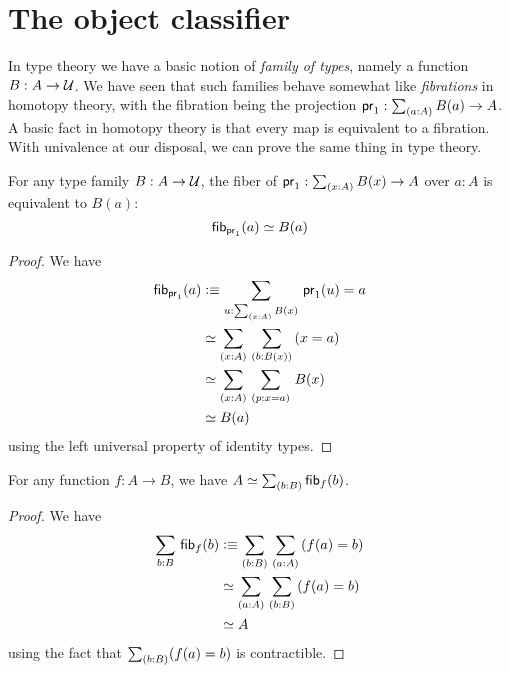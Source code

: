 %


\section{The object classifier}
\label{sec:object-classification}

In type theory we have a basic notion of \emph{family of types}, namely a function $B:A\to\mathcal{U}$.
We have seen that such families behave somewhat like \emph{fibrations} in homotopy theory, with the fibration being the projection $\proj1:\sm{a:A} B(a) \to A$.
A basic fact in homotopy theory is that every map is equivalent to a fibration.
With univalence at our disposal, we can prove the same thing in type theory.

\begin{lem}\label{thm:fiber-of-a-fibration}
  For any type family $B:A\to\mathcal{U}$, the fiber of $\proj1:\sm{x:A} B(x) \to A$ over $a:A$ is equivalent to $B(a)$:
  \[ {\mathsf{fib}}_{\mathsf{pr}_{1}}(a) \simeq B(a) \]
\end{lem}
\begin{proof}
  We have
  \begin{align*}
    \hfib{\proj1}{a} &\defeq \sm{u:\sm{x:A} B(x)} \proj1(u)=a\\
    &\eqvsym \sm{x:A}{b:B(x)} (x=a)\\
    &\eqvsym \sm{x:A}{p:x=a} B(x)\\
    &\eqvsym B(a)
  \end{align*}
  using the left universal property of identity types.
\end{proof}

\begin{lem}\label{thm:total-space-of-the-fibers}
  For any function $f:A\to B$, we have $\eqv{A}{\sm{b:B}\hfib{f}{b}}$.
\end{lem}
\begin{proof}
  We have
  \begin{align*}
    \sm{b:B}\hfib{f}{b} &\defeq \sm{b:B}{a:A} (f(a)=b)\\
    &\eqvsym \sm{a:A}{b:B} (f(a)=b)\\
    &\eqvsym A
  \end{align*}
  using the fact that $\sm{b:B} (f(a)=b)$ is contractible.
\end{proof}

